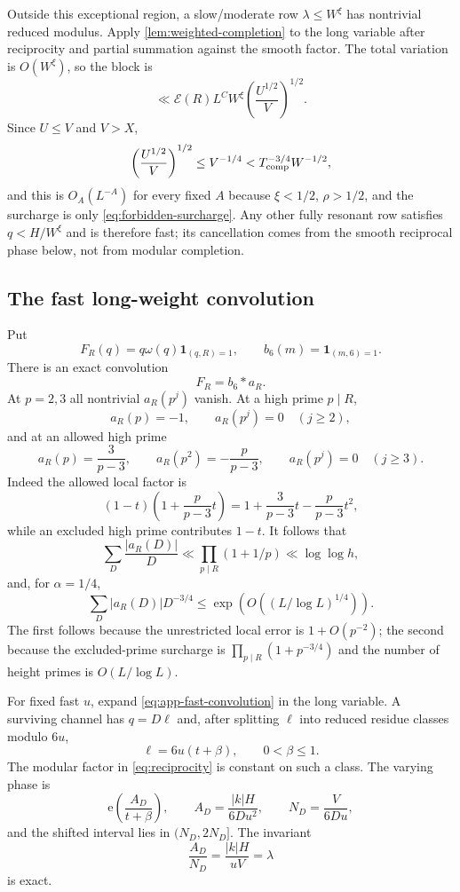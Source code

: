 \documentclass[11pt]{article}
\theoremstyle{definition}
\theoremstyle{remark}
\newcommand{\Ecal}{\mathcal E}
\newcommand{\e}{\mathrm e}
\newcommand{\1}{\mathbf 1}
\newcommand{\om}{\omega}
\begin{document}
Outside this exceptional region, a slow/moderate row $\lambda\le W^\xi$ has nontrivial reduced modulus.  Apply \cref{lem:weighted-completion} to the long variable after reciprocity and partial summation against the smooth factor.  The total variation is $O(W^\xi)$, so the block is
\[
\ll\Ecal(R)L^CW^\xi
 \left(\frac{U^{1/2}}V\right)^{1/2}.
\]
Since $U\le V$ and $V>X$,
\[
\left(\frac{U^{1/2}}V\right)^{1/2}
\le V^{-1/4}<T_{\rm comp}^{-3/4}W^{-1/2},
\]
and this is $O_A(L^{-A})$ for every fixed $A$ because $\xi<1/2$, $\rho>1/2$, and the surcharge is only \cref{eq:forbidden-surcharge}.  Any other fully resonant row satisfies $q<H/W^\xi$ and is therefore fast; its cancellation comes from the smooth reciprocal phase below, not from modular completion.

\subsection{The fast long-weight convolution}
Put
\[
F_R(q)=q\om(q)\mathbf1_{(q,R)=1},
\qquad b_6(m)=\mathbf1_{(m,6)=1}.
\]
There is an exact convolution
\begin{equation}\label{eq:app-fast-convolution}
F_R=b_6*a_R.
\end{equation}
At $p=2,3$ all nontrivial $a_R(p^j)$ vanish.  At a high prime $p\mid R$,
\[
a_R(p)=-1,\qquad a_R(p^j)=0\quad(j\ge2),
\]
and at an allowed high prime
\[
a_R(p)=\frac3{p-3},\qquad
a_R(p^2)=-\frac p{p-3},\qquad
a_R(p^j)=0\quad(j\ge3).
\]
Indeed the allowed local factor is
\[
(1-t)\left(1+\frac p{p-3}t\right)
=1+\frac3{p-3}t-\frac p{p-3}t^2,
\]
while an excluded high prime contributes $1-t$.  It follows that
\begin{equation}\label{eq:app-aR-l1}
\sum_D\frac{|a_R(D)|}{D}
\ll\prod_{p\mid R}(1+1/p)\ll\log\log h,
\end{equation}
and, for $\alpha=1/4$,
\begin{equation}\label{eq:app-aR-moment}
\sum_D|a_R(D)|D^{-3/4}
\le\exp\!\left(O((L/\log L)^{1/4})\right).
\end{equation}
The first follows because the unrestricted local error is $1+O(p^{-2})$; the second because the excluded-prime surcharge is
$\prod_{p\mid R}(1+p^{-3/4})$ and the number of height primes is $O(L/\log L)$.

For fixed fast $u$, expand \cref{eq:app-fast-convolution} in the long variable.  A surviving channel has $q=D\ell$ and, after splitting $\ell$ into reduced residue classes modulo $6u$,
\[
\ell=6u(t+\beta),\qquad0<\beta\le1.
\]
The modular factor in \cref{eq:reciprocity} is constant on such a class.  The varying phase is
\[
\e\!\left(\frac{A_D}{t+\beta}\right),
\qquad
A_D=\frac{|k|H}{6Du^2},
\qquad
N_D=\frac{V}{6Du},
\]
and the shifted interval lies in $(N_D,2N_D]$.  The invariant
\[
\frac{A_D}{N_D}=\frac{|k|H}{uV}=\lambda
\]
is exact.
\end{document}
